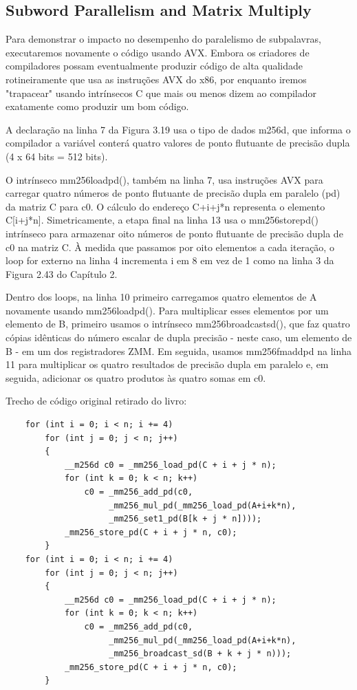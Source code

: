 \documentclass[12pt]{article}
\begin{document}
\newpage
\newpage

\subsection{Subword Parallelism and Matrix Multiply}

Para demonstrar o impacto no desempenho do paralelismo de subpalavras, executaremos novamente o código usando AVX. Embora os criadores de compiladores possam eventualmente produzir código de alta qualidade rotineiramente que usa as instruções AVX do x86, por enquanto iremos "trapacear" usando intrínsecos C que mais ou menos dizem ao compilador exatamente como produzir um bom código. 

A declaração na linha 7 da Figura 3.19 usa o tipo de dados m256d, que informa o compilador a variável conterá quatro valores de ponto flutuante de precisão dupla (4 x 64 bits = 512 bits).

O intrínseco mm256loadpd(), também na linha 7, usa instruções AVX para carregar quatro números de ponto flutuante de precisão dupla em paralelo (pd) da matriz C para c0. O cálculo do endereço C+i+j*n representa o elemento C[i+j*n]. Simetricamente, a etapa final na linha 13 usa o mm256storepd() intrínseco para armazenar oito números de ponto flutuante de precisão dupla de c0 na matriz C. À medida que passamos por oito elementos a cada iteração, o loop for externo na linha 4 incrementa i em 8 em vez de 1 como na linha 3 da Figura 2.43 do Capítulo 2.

Dentro dos loops, na linha 10 primeiro carregamos quatro elementos de A novamente usando mm256loadpd(). Para multiplicar esses elementos por um elemento de B, primeiro usamos o intrínseco mm256broadcastsd(), que faz quatro cópias idênticas do número escalar de dupla precisão - neste caso, um elemento de B - em um dos registradores ZMM. Em seguida, usamos mm256fmaddpd na linha 11 para multiplicar os quatro resultados de precisão dupla em paralelo e, em seguida, adicionar os quatro produtos às quatro somas em c0.

Trecho de código original retirado do livro:

\begin{lstlisting}
    for (int i = 0; i < n; i += 4)
        for (int j = 0; j < n; j++)
        {
            __m256d c0 = _mm256_load_pd(C + i + j * n);
            for (int k = 0; k < n; k++)
                c0 = _mm256_add_pd(c0,
                     _mm256_mul_pd(_mm256_load_pd(A+i+k*n),
                     _mm256_set1_pd(B[k + j * n])));
            _mm256_store_pd(C + i + j * n, c0);
        }
    for (int i = 0; i < n; i += 4)
        for (int j = 0; j < n; j++)
        {
            __m256d c0 = _mm256_load_pd(C + i + j * n);
            for (int k = 0; k < n; k++)
                c0 = _mm256_add_pd(c0,
                     _mm256_mul_pd(_mm256_load_pd(A+i+k*n),
                     _mm256_broadcast_sd(B + k + j * n)));
            _mm256_store_pd(C + i + j * n, c0);
        }
\end{lstlisting}
\end{document}
